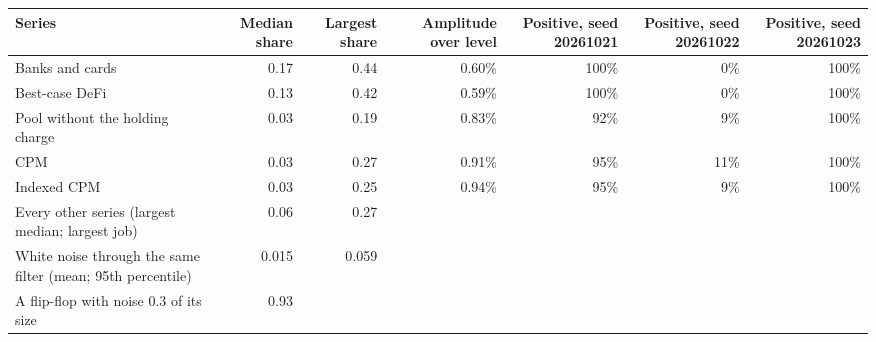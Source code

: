 \begin{tabular}{lrrrrrr}
\toprule
Series & Median share & Largest share & Amplitude over level & Positive, seed 20261021 & Positive, seed 20261022 & Positive, seed 20261023 \\
\midrule
Banks and cards & 0.17 & 0.44 & 0.60\% & 100\% & 0\% & 100\% \\
Best-case DeFi & 0.13 & 0.42 & 0.59\% & 100\% & 0\% & 100\% \\
Pool without the holding charge & 0.03 & 0.19 & 0.83\% & 92\% & 9\% & 100\% \\
CPM & 0.03 & 0.27 & 0.91\% & 95\% & 11\% & 100\% \\
Indexed CPM & 0.03 & 0.25 & 0.94\% & 95\% & 9\% & 100\% \\
\midrule
Every other series (largest median; largest job) & 0.06 & 0.27 &  &  &  &  \\
White noise through the same filter (mean; 95th percentile) & 0.015 & 0.059 &  &  &  &  \\
A flip-flop with noise 0.3 of its size & 0.93 &  &  &  &  &  \\
\bottomrule
\end{tabular}
